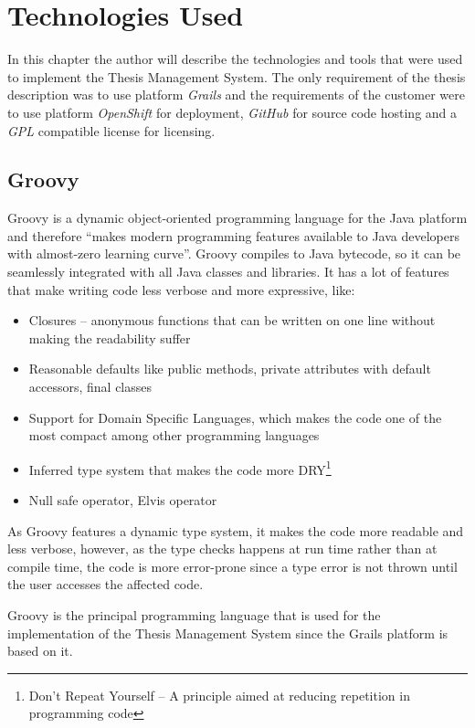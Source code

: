 \chapter{Technologies Used}

In this chapter the author will describe the technologies and tools that were used to implement the Thesis Management System. The only requirement of the thesis description was to use platform \emph{Grails} and the requirements of the customer were to use platform \emph{OpenShift} for deployment, \emph{GitHub} for source code hosting and a \emph{GPL} compatible license for licensing.

\section{Groovy}

Groovy is a dynamic object-oriented programming language for the Java platform and therefore ``makes modern programming features available to Java developers with almost-zero learning curve''\cite{groovy-homepage}. Groovy compiles to Java bytecode, so it can be seamlessly integrated with all Java classes and libraries\cite{groovy-homepage}. It has a lot of features that make writing code less verbose and more expressive, like:

\begin{itemize}
    \item Closures -- anonymous functions that can be written on one line without making the readability suffer
    \item Reasonable defaults like public methods, private attributes with default accessors, final classes
    \item Support for Domain Specific Languages, which makes the code one of the most compact among other programming languages
    \item Inferred type system that makes the code more DRY\footnote{Don't Repeat Yourself -- A principle aimed at reducing repetition in programming code}
    \item Null safe operator, Elvis operator
\end{itemize}

As Groovy features a dynamic type system, it makes the code more readable and less verbose, however, as the type checks happens at run time rather than at compile time, the code is more error-prone since a type error is not thrown until the user accesses the affected code\cite{groovy-in-action}.

Groovy is the principal programming language that is used for the implementation of the Thesis Management System since the Grails platform is based on it.

